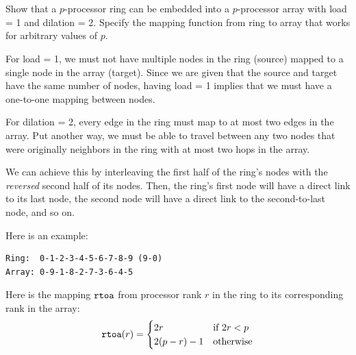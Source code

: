 \documentclass{article}
\begin{document}
\section{}
Show that a $p$-processor ring can be embedded into a $p$-processor array with load = 1 and dilation = 2. Specify the mapping function from ring to array that works for arbitrary values of $p$.

\quad For load = 1, we must not have multiple nodes in the ring (source) mapped to a single node in the array (target).
Since we are given that the source and target have the same number of nodes, having load = 1 implies that we must have a one-to-one mapping between nodes.

For dilation = 2, every edge in the ring must map to at most two edges in the array.
Put another way, we must be able to travel between any two nodes that were originally neighbors in the ring with at most two hops in the array.

We can achieve this by interleaving the first half of the ring's nodes with the \textit{reversed} second half of its nodes.
Then, the ring's first node will have a direct link to its last node, the second node will have a direct link to the second-to-last node, and so on.

Here is an example:
\begin{verbatim}
Ring:  0-1-2-3-4-5-6-7-8-9 (9-0)
Array: 0-9-1-8-2-7-3-6-4-5
\end{verbatim}
Here is the mapping $\verb|rtoa|$ from processor rank $r$ in the ring to its corresponding rank in the array:
$$\verb|rtoa|(r) = \begin{cases} 2r & \text{if $2r < p$}\\2(p - r) - 1 & \text{otherwise}\end{cases}$$
\section{}
\end{document}
